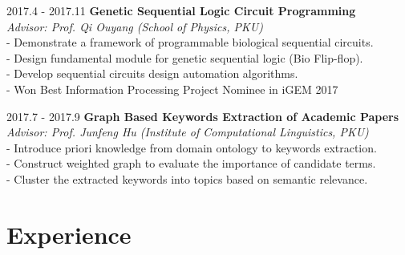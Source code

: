 \documentclass{academiccv}
\begin{document}
\begin{tablist}

\item[2017.4 - 2017.11] 	\tab \textbf {Genetic Sequential Logic Circuit Programming} \textbf
				     \\ \tab \emph{Advisor: Prof. Qi Ouyang (School of Physics, PKU)}\emph
				     \\ \tab - Demonstrate a framework of programmable biological sequential circuits.
				     \\ \tab - Design fundamental module for genetic sequential logic (Bio Flip-flop). 
				     \\ \tab - Develop sequential circuits design automation algorithms.
				      \\ \tab - Won Best Information Processing Project Nominee in iGEM 2017
				     
				     				     
\item[2017.7 - 2017.9] 	\tab \textbf {Graph Based Keywords Extraction of Academic Papers} \textbf
				     \\ \tab \emph{Advisor: Prof. Junfeng Hu (Institute of Computational Linguistics, PKU)}\emph
				     \\ \tab - Introduce priori knowledge from domain ontology to keywords extraction.
				     \\ \tab - Construct weighted graph to evaluate the importance of candidate terms.
				     \\ \tab - Cluster the extracted keywords into topics based on semantic relevance.
				     
\end{tablist}


\section*{Experience}
\end{document}
